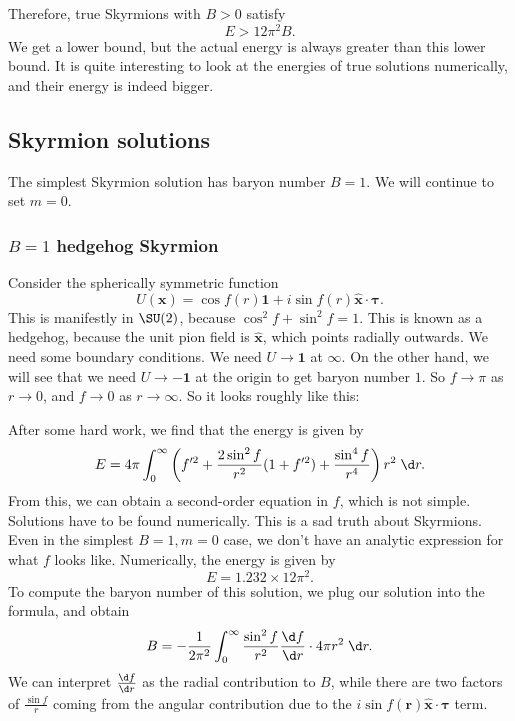 \documentclass[a4paper]{article}
\begin{document}
Therefore, true Skyrmions with $B > 0$ satisfy
\[
  E > 12 \pi^2 B.
\]
We get a lower bound, but the actual energy is always greater than this lower bound. It is quite interesting to look at the energies of true solutions numerically, and their energy is indeed bigger.

\subsection{Skyrmion solutions}
The simplest Skyrmion solution has baryon number $B = 1$. We will continue to set $m = 0$.
\subsubsection*{$B = 1$ hedgehog Skyrmion}
Consider the spherically symmetric function
\[
  U(\mathbf{x}) = \cos f(r) \mathbf{1} + i \sin f(r) \hat{\mathbf{x}} \cdot \boldsymbol\tau.
\]
This is manifestly in $\SU(2)$, because $\cos^2 f + \sin^2 f = 1$. This is known as a hedgehog, because the unit pion field is $\hat{\mathbf{x}}$, which points radially outwards. We need some boundary conditions. We need $U \to \mathbf{1}$ at $\infty$. On the other hand, we will see that we need $U \to -\mathbf{1}$ at the origin to get baryon number $1$. So $f \to \pi$ as $r \to 0$, and $f \to 0$ as $r \to \infty$. So it looks roughly like this:
\begin{center}
\end{center}
After some hard work, we find that the energy is given by
\[
  E = 4\pi \int_0^\infty \left(f'^2 + \frac{2 \sin^2 f}{r^2}(1 + f'^2) + \frac{\sin^4 f}{r^4}\right) r^2\;\d r.
\]
From this, we can obtain a second-order equation in $f$, which is not simple. Solutions have to be found numerically. This is a sad truth about Skyrmions. Even in the simplest $B = 1, m = 0$ case, we don't have an analytic expression for what $f$ looks like. Numerically, the energy is given by
\[
  E = 1.232 \times 12\pi^2.
\]
To compute the baryon number of this solution, we plug our solution into the formula, and obtain
\[
  B = - \frac{1}{2\pi^2} \int_0^\infty \frac{\sin^2 f}{r^2} \frac{\d f}{\d r} \cdot 4\pi r^2 \;\d r.
\]
We can interpret $\frac{\d f}{\d r}$ as the radial contribution to $B$, while there are two factors of $\frac{\sin f}{r}$ coming from the angular contribution due to the $i \sin f(\mathbf{r}) \hat{\mathbf{x}} \cdot \boldsymbol\tau$ term.
\end{document}
